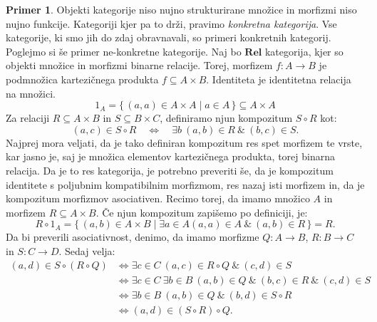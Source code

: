 \documentclass[12pt,a4paper]{book}
\theoremstyle{definition}
\theoremstyle{plain}
\theoremstyle{definition}
\newtheorem{primer}{Primer}[section]
\theoremstyle{remark}
\newcommand{\cat}[1]{\textbf{#1}}
\renewcommand{\set}[1]{\{\,#1\,\}}
\begin{document}
\begin{primer}
Objekti kategorije niso nujno strukturirane množice in morfizmi niso nujno funkcije. Kategoriji kjer pa to drži, pravimo \emph{konkretna kategorija}. Vse kategorije, ki smo jih do zdaj obravnavali, so primeri konkretnih kategorij.
Poglejmo si še primer ne-konkretne kategorije. Naj bo $\cat{Rel}$ kategorija, kjer so objekti množice in morfizmi binarne relacije. Torej, morfizem $f : A \to B$ je podmnožica kartezičnega produkta $f \subseteq A \times B$. Identiteta je identitetna relacija na množici.
$$ 1_A = \set{(a,a) \in A \times A \mid a \in A} \subseteq A \times A$$
Za relaciji $R \subseteq A \times B$ in $S \subseteq B \times C$, definiramo njun kompozitum $S \circ R$ kot:
$$(a,c) \in S \circ R \quad \Leftrightarrow \quad \exists b \ (a,b) \in R \ \& \ (b,c) \in S.$$
%
Najprej mora veljati, da je tako definiran kompozitum res spet morfizem te vrste, kar jasno je, saj je množica elementov kartezičnega produkta, torej binarna relacija. Da je to res kategorija, je potrebno preveriti še, da je kompozitum identitete s poljubnim kompatibilnim morfizmom, res nazaj isti morfizem in, da je kompozitum morfizmov asociativen. Recimo torej, da imamo množico $A$ in morfizem $R \subseteq A \times B$. Če njun kompozitum zapišemo po definiciji, je:
$$R \circ 1_A = \set{(a,b) \in A \times B \mid \exists a \in A (a,a) \in A \ \& \ (a,b)\in R} = R.$$
Da bi preverili asociativnost, denimo, da imamo morfizme $Q:A \to B$, $R:B \to C$ in $S: C \to D$. Sedaj velja:
\begin{align*}
(a,d) \in S \circ (R \circ Q) &\Leftrightarrow \exists c \in C \ (a,c) \in R \circ Q \ \& \ (c,d) \in S \\
&\Leftrightarrow \exists c \in C \ \exists b \in B \ (a,b) \in Q \ \& \ (b,c) \in R \ \& \ (c,d) \in S \\
&\Leftrightarrow \exists b \in B \ (a,b) \in Q \ \& \ (b,d) \in S \circ R \\
&\Leftrightarrow (a,d) \in (S \circ R) \circ Q.
\end{align*}

\end{primer}
\end{document}
